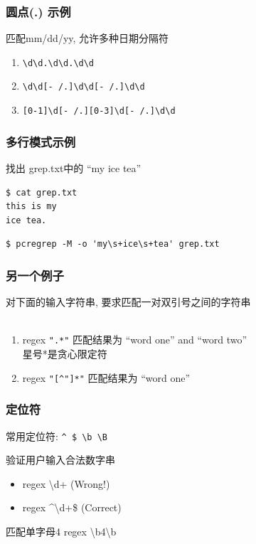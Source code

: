 \documentclass[compress]{beamer}
\begin{document}
\begin{frame}[fragile]
\frametitle{圆点(.) 示例}

\begin{block}{匹配mm/dd/yy, 允许多种日期分隔符}
\begin{enumerate}
\item {\verb=\d\d.\d\d.\d\d=}
\item {\verb*=\d\d[- /.]\d\d[- /.]\d\d=}
\item {\verb*=[0-1]\d[- /.][0-3]\d[- /.]\d\d=}
\end{enumerate}
\end{block}
\end{frame}

\begin{frame}[fragile]
\frametitle{多行模式示例}
\noindent 找出 grep.txt中的 ``my ice tea''
\begin{verbatim}
$ cat grep.txt
this is my
ice tea.
\end{verbatim}
\pause
\begin{verbatim}
$ pcregrep -M -o 'my\s+ice\s+tea' grep.txt
\end{verbatim}
\end{frame}

\begin{frame}[fragile]
\frametitle{另一个例子}
对下面的输入字符串, 要求匹配一对双引号之间的字符串\\[2ex]
 \\[2ex]

\begin{enumerate}
\item regex {\verb=".*"=} 匹配结果为  ``word one'' and ``word two''  \\
    星号*是贪心限定符
\item regex {\verb*="[^"]*"=} 匹配结果为  ``word one''
\end{enumerate}
\end{frame}

\begin{frame}[fragile]
\frametitle{定位符}

常用定位符: {\verb=^ $ \b \B=}

\begin{block}{验证用户输入合法数字串}
	\begin{itemize}
		\item regex \textbackslash{}d+  (Wrong!) 
		\item regex  \textasciicircum\textbackslash{}d+\$ (Correct)
\end{itemize}
\end{block}

\begin{block}{匹配单字母4}   
	regex \textbackslash{}b4\textbackslash{}b 
\end{block}
\end{frame}
\end{document}
